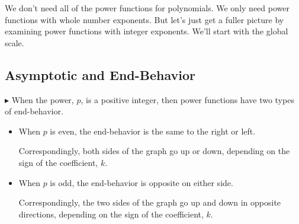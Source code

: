 \documentclass{ximera}
\begin{document}
We don't need all of the power functions for polynomials.  We only need power functions with whole number exponents. But let's just get a fuller picture by examining power functions with integer exponents. We'll start with the global scale.





\subsection*{Asymptotic and End-Behavior}



$\blacktriangleright$  When the power, $p$, is a positive integer, then power functions have two types of end-behavior.

\begin{itemize}
\item When $p$ is even, the end-behavior is the same to the right or left.


Correspondingly, both sides of the graph go up or down, depending on the sign of the coefficient, $k$.


\item When $p$ is odd, the end-behavior is opposite on either side.


Correspondingly, the two sides of the graph go up and down in opposite directions, depending on the sign of the coefficient, $k$.




\end{itemize}
\end{document}
